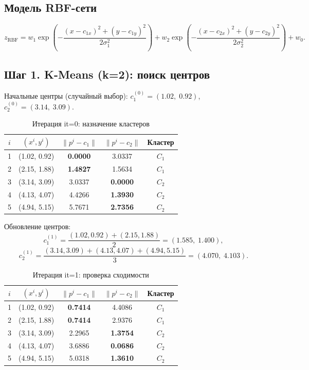 \documentclass[12pt,a4paper]{article}
\begin{document}
\subsection{Модель RBF-сети}

\begin{equation}
  z_{\mathrm{RBF}} = w_1\exp\!\left(-\frac{(x-c_{1x})^2+(y-c_{1y})^2}{2\sigma_1^2}\right)
  + w_2\exp\!\left(-\frac{(x-c_{2x})^2+(y-c_{2y})^2}{2\sigma_2^2}\right) + w_0.
\end{equation}

\subsection{Шаг 1. K-Means (k=2): поиск центров}

Начальные центры (случайный выбор): $c_1^{(0)} = (1.02,\;0.92)$, $c_2^{(0)} = (3.14,\;3.09)$.

\begin{table}[H]
\centering
\caption{Итерация it=0: назначение кластеров}
\begin{tabular}{ccccc}
\toprule
$i$ & $(x^i, y^i)$ & $\|p^i - c_1\|$ & $\|p^i - c_2\|$ & Кластер \\
\midrule
1 & (1.02, 0.92) & \textbf{0.0000} & 3.0337 & $C_1$ \\
2 & (2.15, 1.88) & \textbf{1.4827} & 1.5634 & $C_1$ \\
3 & (3.14, 3.09) & 3.0337 & \textbf{0.0000} & $C_2$ \\
4 & (4.13, 4.07) & 4.4266 & \textbf{1.3930} & $C_2$ \\
5 & (4.94, 5.15) & 5.7671 & \textbf{2.7356} & $C_2$ \\
\bottomrule
\end{tabular}
\end{table}

Обновление центров:
\[
  c_1^{(1)} = \frac{(1.02,0.92)+(2.15,1.88)}{2} = (1.585,\;1.400),
\]
\[
  c_2^{(1)} = \frac{(3.14,3.09)+(4.13,4.07)+(4.94,5.15)}{3} = (4.070,\;4.103).
\]

\begin{table}[H]
\centering
\caption{Итерация it=1: проверка сходимости}
\begin{tabular}{ccccc}
\toprule
$i$ & $(x^i, y^i)$ & $\|p^i - c_1\|$ & $\|p^i - c_2\|$ & Кластер \\
\midrule
1 & (1.02, 0.92) & \textbf{0.7414} & 4.4086 & $C_1$ \\
2 & (2.15, 1.88) & \textbf{0.7414} & 2.9376 & $C_1$ \\
3 & (3.14, 3.09) & 2.2965 & \textbf{1.3754} & $C_2$ \\
4 & (4.13, 4.07) & 3.6886 & \textbf{0.0686} & $C_2$ \\
5 & (4.94, 5.15) & 5.0318 & \textbf{1.3610} & $C_2$ \\
\bottomrule
\end{tabular}
\end{table}
\end{document}
